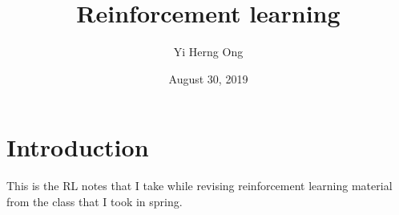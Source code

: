 \documentclass{article}
\title{Reinforcement learning}
\author{Yi Herng Ong}
\date{August 30, 2019}
\begin{document}
\maketitle

\section{Introduction}
This is the RL notes that I take while revising reinforcement learning material from the class that I took in spring. 
\end{document}
